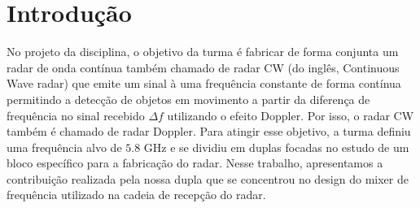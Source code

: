 \documentclass[10pt]{article}
\begin{document}

\begin{abstract}
O objetivo desse trabalho é relatar o design e implementação de um mixer de frequência para o projeto da disciplina PSI 5844.
\end{abstract}

\section{Introdução} \label{section:intro}

No projeto da disciplina, o objetivo da turma é fabricar de forma conjunta um radar de onda contínua também chamado de radar CW (do inglês, Continuous Wave radar) que emite um sinal à uma frequência constante de forma contínua permitindo a detecção de objetos em movimento a partir da diferença de frequência no sinal recebido $\Delta f$ utilizando o efeito Doppler. Por isso, o radar CW também é chamado de radar Doppler. Para atingir esse objetivo, a turma definiu uma frequência alvo de $5.8$ GHz e se dividiu em duplas focadas no estudo de um bloco específico para a fabricação do radar. Nesse trabalho, apresentamos a contribuição realizada pela nossa dupla que se concentrou no design do mixer de frequência utilizado na cadeia de recepção do radar.
\end{document}
